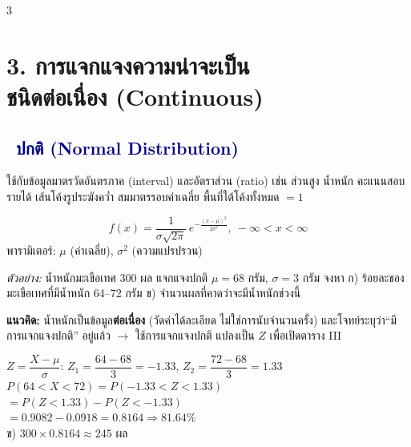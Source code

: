 \documentclass[9pt]{extarticle}
\newcommand{\dist}[1]{\subsection*{\textcolor{navy}{\textbullet\ #1}}}
\begin{document}
\begin{multicols}{3}
\section*{3. การแจกแจงความน่าจะเป็น\\ชนิดต่อเนื่อง (Continuous)}

\dist{ปกติ (Normal Distribution)}
ใช้กับข้อมูลมาตรวัดอันตรภาค (interval) และอัตราส่วน (ratio) เช่น ส่วนสูง น้ำหนัก คะแนนสอบ รายได้ เส้นโค้งรูประฆังคว่ำ สมมาตรรอบค่าเฉลี่ย พื้นที่ใต้โค้งทั้งหมด $=1$
\begin{formulabox}
$$f(x)=\dfrac{1}{\sigma\sqrt{2\pi}}\,e^{-\frac{(x-\mu)^2}{2\sigma^2}},\ -\infty<x<\infty$$
พารามิเตอร์: $\mu$ (ค่าเฉลี่ย), $\sigma^2$ (ความแปรปรวน)
\end{formulabox}

\textit{ตัวอย่าง:} น้ำหนักมะเขือเทศ 300 ผล แจกแจงปกติ $\mu=68$ กรัม, $\sigma=3$ กรัม จงหา ก) ร้อยละของมะเขือเทศที่มีน้ำหนัก 64--72 กรัม ข) จำนวนผลที่คาดว่าจะมีน้ำหนักช่วงนี้
\begin{ideabox}
\textbf{แนวคิด:} น้ำหนักเป็น\allowbreak ข้อมูล\textbf{ต่อเนื่อง} (วัดค่าได้\allowbreak ละเอียด ไม่ใช่การนับ\allowbreak จำนวนครั้ง) และโจทย์\allowbreak ระบุว่า\allowbreak ``มีการแจกแจง\allowbreak ปกติ'' อยู่แล้ว $\to$ ใช้การแจกแจง\allowbreak ปกติ แปลงเป็น $Z$ เพื่อเปิด\allowbreak ตาราง III
\end{ideabox}
\begin{solbox}
$Z=\dfrac{X-\mu}{\sigma}$: $Z_1=\dfrac{64-68}{3}=-1.33$, $Z_2=\dfrac{72-68}{3}=1.33$\\
$P(64{<}X{<}72)=P(-1.33{<}Z{<}1.33)$\\
$=P(Z{<}1.33)-P(Z{<}-1.33)$\\
$=0.9082-0.0918=0.8164 \Rightarrow 81.64\%$\\
ข) $300\times0.8164\approx245$ ผล
\end{solbox}

\begin{center}
\vspace{-2pt}
\vspace{-4pt}
\end{center}


\end{multicols}
\end{document}
